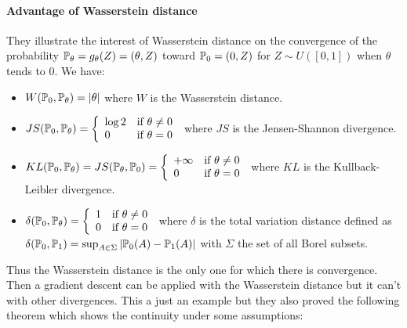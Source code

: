 \paragraph{Advantage of Wasserstein distance}
They illustrate the interest of Wasserstein distance on the convergence of the probability $\mathbb{P}_\theta = g_\theta(Z) = (\theta, Z)$ toward $\mathbb{P}_0 = (0, Z)$ for $Z \sim U([0, 1])$ when $\theta$ tends to 0. We have:
\begin{itemize}
	\item $W(\mathbb{P}_0, \mathbb{P}_\theta) = | \theta |$ where $W$ is the Wasserstein distance.
	\item $JS(\mathbb{P}_0, \mathbb{P}_\theta) = \left\{ \begin{array}{ll}
			\log 2 & \text{if } \theta \neq 0 \\
			0 & \text{if } \theta = 0
		\end{array} \right.$ where $JS$ is the Jensen-Shannon divergence.
	\item $KL(\mathbb{P}_0, \mathbb{P}_\theta) = JS(\mathbb{P}_\theta, \mathbb{P}_0) = \left\{ \begin{array}{ll}
			+ \infty & \text{if } \theta \neq 0 \\
			0 & \text{if } \theta = 0
		\end{array} \right.$ where $KL$ is the Kullback-Leibler divergence.
	\item $\delta(\mathbb{P}_0, \mathbb{P}_\theta) = \left\{ \begin{array}{ll}
			1 & \text{if } \theta \neq 0 \\
			0 & \text{if } \theta = 0
		\end{array} \right.$ where $\delta$ is the total variation distance defined as $\delta(\mathbb{P}_0, \mathbb{P}_1) = \sup_{A \in \Sigma} | \mathbb{P}_0(A) - \mathbb{P}_1(A) |$ with $\Sigma$ the set of all Borel subsets.
\end{itemize}
Thus the Wasserstein distance is the only one for which there is convergence. Then a gradient descent can be applied with the Wasserstein distance but it can't with other divergences. This a just an example but they also proved the following theorem which shows the continuity under some assumptions:


